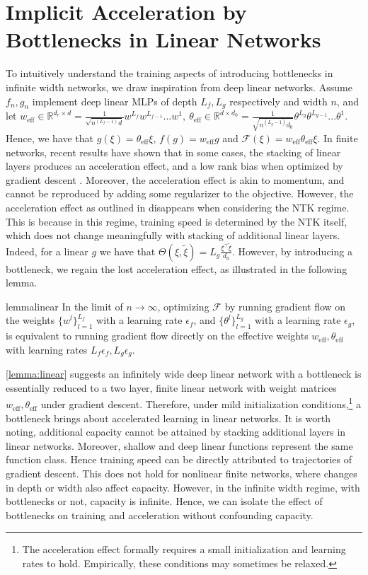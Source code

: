 \documentclass{article}
\theoremstyle{definition}
\theoremstyle{remark}
\renewcommand{\[}{\begin{eqnarray}}
\renewcommand{\]}{\end{eqnarray}}
\renewcommand{\[}{\begin{eqnarray}}
\renewcommand{\]}{\end{eqnarray}}
\newcommand{\R}{\mathbb{R}}
\newcommand{\F}{\mathcal{F}}
\begin{document}
\section{Implicit Acceleration by Bottlenecks in Linear Networks}\label{sec:implicit}
To intuitively understand the training aspects of introducing bottlenecks in infinite width networks, we draw inspiration from deep linear networks. Assume $f_n,g_n$ implement deep linear MLPs of depth $L_f,L_g$ respectively and width $n$, and let $w_{\text{eff}} \in \R^{d_r \times d} = \frac{1}{\sqrt{n^{(L_f-1)} d}}w^{L_f}w^{L_{f-1}}...w^1,~\theta_\text{eff} \in \R^{d \times d_0} = \frac{1}{\sqrt{n^{(L_g-1)} d_0}}\theta^{L_g}\theta^{L_{g-1}}...\theta^1$. Hence, we have that $g(\xi) = \theta_\text{eff} \xi$, $f(g) = w_{\text{eff}} g$ and $\F(\xi) = w_{\text{eff}}\theta_\text{eff} \xi$. In finite networks, recent results have shown that in some cases, the stacking of linear layers produces an acceleration effect, and a low rank bias when optimized by gradient descent \cite{Arora2018OnTO}. Moreover, the acceleration effect is akin to momentum, and cannot be reproduced by adding some regularizer to the objective.  However, the acceleration effect as outlined in \cite{Arora2018OnTO} disappears when considering the NTK regime. This is because in this regime, training speed is determined by the NTK itself, which does not change meaningfully with stacking of additional linear layers. Indeed, for a linear $g$ we have that $\Theta(\xi,\tilde{\xi}) = L_g\frac{\xi^\top\tilde{\xi}}{d_0}$. However, by introducing a bottleneck, we regain the lost acceleration effect, as illustrated in the following lemma.
\begin{restatable}{lemma}{linear}\label{lemma:linear}
In the limit of $n \to \infty$, optimizing $\F$ by running gradient flow on the weights $\{w^l\}_{l=1}^{L_f}$ with a learning rate $\epsilon_f$, and  $\{\theta^l\}_{l=1}^{L_g}$ with a learning rate $\epsilon_g$, is equivalent to running gradient flow directly on the effective weights $w_{\text{eff}}, \theta_\text{eff}$ with learning rates $L_f\epsilon_f,L_g\epsilon_g$.
\end{restatable}
 \cref{lemma:linear} suggests an infinitely wide deep linear network with a bottleneck is essentially reduced to a two layer, finite linear network with weight matrices $w_{\text{eff}}, \theta_\text{eff}$ under gradient descent. Therefore, under mild initialization conditions,\footnote{The acceleration effect formally requires a small initialization and learning rates to hold. Empirically, these conditions may sometimes be relaxed.} a bottleneck brings about accelerated learning in linear networks. It is worth noting, additional capacity cannot be attained by stacking additional layers in linear networks. Moreover, shallow and deep linear functions represent the same function class. Hence training speed can be directly attributed to trajectories of gradient descent. This does not hold for nonlinear finite networks, where changes in depth or width also affect capacity. However, in the infinite width regime, with bottlenecks or not, capacity is infinite. Hence, we can isolate the effect of bottlenecks on training and acceleration without confounding capacity.
 
\end{document}
